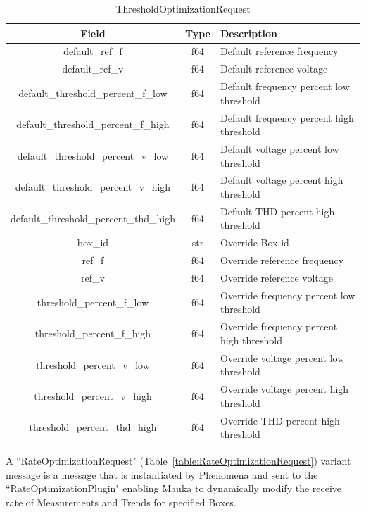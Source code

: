 \begin{table}[H]
	\centering
	\caption{ThresholdOptimizationRequest}
	\begin{tabular}{|c|c|p{8cm}|}
		\hline
		Field & Type & Description  \\
		\hline
		default\_ref\_f & f64 & Default reference frequency \\
		\hline
		default\_ref\_v & f64 & Default reference voltage \\
		\hline
		default\_threshold\_percent\_f\_low & f64 & Default frequency percent low threshold \\
		\hline
		default\_threshold\_percent\_f\_high & f64 & Default frequency percent high threshold \\
		\hline
		default\_threshold\_percent\_v\_low & f64 & Default voltage percent low threshold \\
		\hline
		default\_threshold\_percent\_v\_high & f64 & Default voltage percent high threshold \\
		\hline
		default\_threshold\_percent\_thd\_high & f64 & Default THD percent high threshold \\
		\hline
		box\_id & str & Override Box id \\
		\hline
		ref\_f & f64 & Override reference frequency \\
		\hline
		ref\_v & f64 & Override reference voltage \\
		\hline
		threshold\_percent\_f\_low & f64 & Override frequency percent low threshold \\
		\hline
		threshold\_percent\_f\_high & f64 & Override frequency percent high threshold \\
		\hline
		threshold\_percent\_v\_low & f64 & Override voltage percent low threshold \\
		\hline
		threshold\_percent\_v\_high & f64 & Override voltage percent high threshold \\
		\hline
		threshold\_percent\_thd\_high & f64 & Override THD percent high threshold \\
		\hline
	\end{tabular}
	\label{table:ThresholdOptimziationRequest}
\end{table}

A ``RateOptimizationRequest" (Table~\ref{table:RateOptimizationRequest}) variant message is a message that is instantiated by Phenomena and sent to the ``RateOptimizationPlugin" enabling Mauka to dynamically modify the receive rate of Measurements and Trends for specified Boxes.


